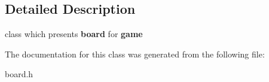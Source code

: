 \subsection{Detailed Description}
class which presents {\bfseries{board}} for {\bfseries{game}} 

The documentation for this class was generated from the following file\+:\begin{DoxyCompactItemize}
\item 
board.\+h\end{DoxyCompactItemize}
